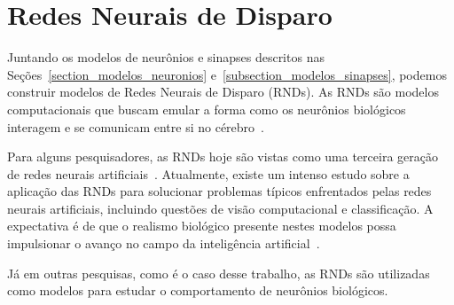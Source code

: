 \section{Redes Neurais de Disparo}

Juntando os modelos de neurônios e sinapses descritos nas Seções~\ref{section_modelos_neuronios}
e~\ref{subsection_modelos_sinapses}, podemos construir modelos de Redes Neurais de Disparo (RNDs). As RNDs são modelos
computacionais que buscam emular a forma como os neurônios biológicos interagem e se comunicam entre si no
cérebro~\cite{yamazakiSpiking2022}. 

Para alguns pesquisadores, as RNDs hoje são vistas como uma terceira geração de redes neurais
artificiais~\cite{maassNetworks1997}. Atualmente, existe um intenso estudo sobre a aplicação das RNDs para solucionar problemas
típicos enfrentados pelas redes neurais artificiais, incluindo questões de visão computacional e classificação. A expectativa é de
que o realismo biológico presente nestes modelos possa impulsionar o avanço no campo da inteligência
artificial~\cite{yamazakiSpiking2022}.

Já em outras pesquisas, como é o caso desse trabalho, as RNDs são utilizadas como modelos para estudar o comportamento de
neurônios biológicos.

